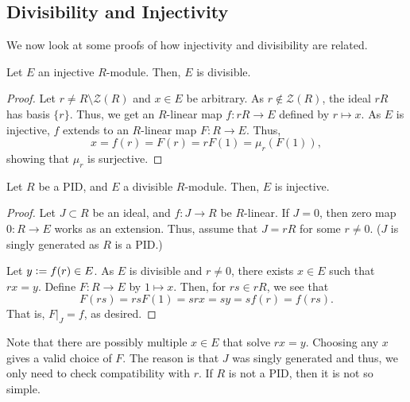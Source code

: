 \subsection{Divisibility and Injectivity} \label{subsec:divisibility-injectivity}

We now look at some proofs of how injectivity and divisibility are related.

\begin{prop}
	Let $E$ an injective $R$-module. Then, $E$ is divisible.
\end{prop}
\begin{proof} 
	Let $r \neq R \setminus \mathcal{Z}(R)$ and $x \in E$ be arbitrary. As $r \notin \mathcal{Z}(R)$, the ideal $rR$ has basis $\{r\}$. Thus, we get an $R$-linear map $f : rR \to E$ defined by $r \mapsto x$. As $E$ is injective, $f$ extends to an $R$-linear map $F : R \to E$. Thus,
	\begin{equation*} 
		x = f(r) = F(r) = r F(1) = \mu_{r}(F(1)),
	\end{equation*}
	showing that $\mu_{r}$ is surjective.
\end{proof}

\begin{prop} \label{prop:PID-divisible-is-injective}
	Let $R$ be a PID, and $E$ a divisible $R$-module. Then, $E$ is injective.
\end{prop}
\begin{proof} 
	Let $J \subset R$ be an ideal, and $f : J \to R$ be $R$-linear. If $J = 0$, then zero map $0 : R \to E$ works as an extension. Thus, assume that $J = rR$ for some $r \neq 0$. ($J$ is singly generated as $R$ is a PID.)

	Let $y \vcentcolon= f(r) \in E$. As $E$ is divisible and $r \neq 0$, there exists $x \in E$ such that $rx = y$. Define $F : R \to E$ by $1 \mapsto x$. Then, for $rs \in rR$, we see that
	\begin{equation*} 
		F(rs) = rs F(1) = srx = sy = sf(r) = f(rs).
	\end{equation*}
	That is, $F|_{J} = f$, as desired.
\end{proof}

Note that there are possibly multiple $x \in E$ that solve $rx = y$. Choosing any $x$ gives a valid choice of $F$. The reason is that $J$ was singly generated and thus, we only need to check compatibility with $r$. If $R$ is not a PID, then it is not so simple.

